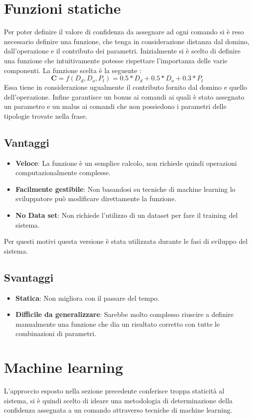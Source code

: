 \documentclass[twoside]{supsistudent}
\begin{document}
\section{Funzioni statiche}
Per poter definire il valore di confidenza da assegnare ad ogni comando si è reso necessario definire una funzione, che tenga in considerazione distanza dal domino, dall'operazione e il contributo dei parametri.
Inizialmente si è scelto di definire una funzione che intuitivamente potesse rispettare l'importanza delle varie componenti.
La funzione scelta è la seguente :
\[
\boldsymbol{C} = f(D_{d} ,D_{o},P_{t}) = 0.5*D_{d}+0.5*D_{o}+0.3*P_{t}
\]
Essa tiene in considerazione ugualmente il contributo fornito dal domino e quello dell'operazione. Infine garantisce un bonus ai comandi ai quali è stato assegnato un parametro e un malus ai comandi che non possiedono i parametri delle tipologie trovate nella frase.
\subsection{Vantaggi}
\begin{itemize}
  \item \textbf{Veloce}: La funzione è un semplice calcolo, non richiede quindi operazioni computazionalmente complesse.
   \item \textbf{Facilmente gestibile}: Non basandosi su tecniche di machine learning lo sviluppatore può modificare direttamente la funzione.
  \item \textbf{No Data set}: Non richiede l'utilizzo di un dataset per fare il training del sistema.
\end{itemize}
Per questi motivi questa versione è stata utilizzata durante le fasi di sviluppo del sistema.
\subsection{Svantaggi}
\begin{itemize}
  \item \textbf{Statica}: Non migliora con il passare del tempo.
   \item \textbf{Difficile da generalizzare}: Sarebbe molto complesso riuscire a definire manualmente una funzione che dia un risultato corretto con tutte le combinazioni di parametri.
\end{itemize}

\section{Machine learning}
L'approccio esposto nella sezione precedente conferisce troppa staticità al sistema, si è quindi scelto di ideare una metodologia di determinazione della confidenza assegnata a un comando attraverso tecniche di machine learning.
\end{document}
